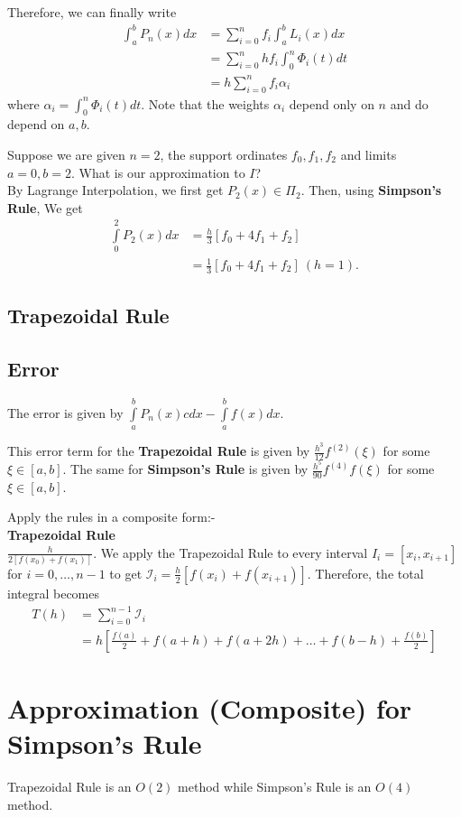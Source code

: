 Therefore, we can finally write 
\begin{align*}
    \int_a^b P_n(x) dx &= \sum_{i=0}^n f_i \int_a^b L_i(x) dx \\
                                 &= \sum_{i=0}^n h f_i \int_{0}^n \Phi _i(t) dt \\
                                 &= h \sum_{i=0}^n f_i \alpha_i
\end{align*}
where $\alpha _i = \int_{0}^n \Phi _i (t) dt$. Note that the weights $\alpha _i$ 
depend only on  $n$ and do depend on  $a,b$. 

\begin{example}
    Suppose we are given $n=2$, the support ordinates $f_0,f_1,f_2$ and limits $a=0, b=2$. 
    What is our approximation to  $I$?
    \\
    By Lagrange Interpolation, we first get $P_2(x) \in \Pi _2$. Then, using \textbf{Simpson's Rule}, We get
    \begin{align*}
        \int \limits _0^2 P_2(x) dx &= \frac{h}{3} [f_0 + 4f_1 +f_2]\\
                                    &= \frac{1}{3}[f_0 + 4f_1 +f_2] \  (h=1)
    .\end{align*}
\end{example}


\subsection{Trapezoidal Rule}

\subsection{Error}

The error is given by $\int \limits _a^b P_n(x)cdx - \int \limits _a^b f(x) dx$.

This error term for the \textbf{Trapezoidal Rule} is given by  $\frac{h^{3}}{12}f^{(2)}( \xi )$ 
for some $\xi \in [a,b]$. The same for \textbf{Simpson's Rule} is given by  
$\frac{h^5}{90}f^{(4)}f(\xi)$ for some $\xi \in [a,b]$.

Apply the rules in a composite form:- \\
\textbf{Trapezoidal Rule}\\
$\frac{h}{2[f(x_0) + f(x_1)]}$. We apply the Trapezoidal Rule to every interval 
$I_i = [x_i, x_{i+1}]$ for $i = 0, \ldots ,n-1$ to get $\mathscr{I} _i = \frac{h}{2} [f(x_i)
 + f(x_{i+1})]$. Therefore, the total integral becomes 
 \begin{align*}
     T(h) &= \sum \limits _{i=0} ^{n-1} \mathscr{I} _i \\
          &= h[\frac{f(a)}{2} + f(a+h) + f(a+2h) + \ldots + f(b-h) + \frac{f(b)}{2}]
 \end{align*}
 
 \section{Approximation (Composite) for Simpson's Rule}

 Trapezoidal Rule is an $O(2)$ method while Simpson's Rule is an $O(4)$ method.


